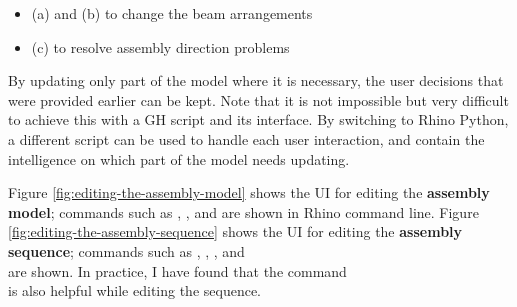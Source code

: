 \begin{itemize}
	\item (a) and (b) to change the beam arrangements
	\item (c) to resolve assembly direction problems
\end{itemize}

By updating only part of the model where it is necessary, the user decisions that were provided earlier can be kept. Note that it is not impossible but very difficult to achieve this with a GH script and its interface. By switching to Rhino Python, a different script can be used to handle each user interaction, and contain the intelligence on which part of the model needs updating.

Figure \ref{fig:editing-the-assembly-model} shows the UI for editing the \textbf{assembly model}; commands such as , , and  are shown in Rhino command line. Figure \ref{fig:editing-the-assembly-sequence} shows the UI for editing the \textbf{assembly sequence}; commands such as , , , and \\  are shown. In practice, I have found that the command\\  is also helpful while editing the sequence.

